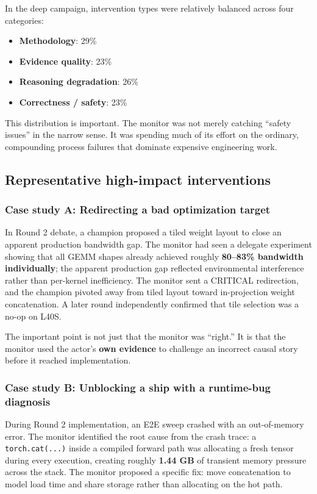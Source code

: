 \documentclass[11pt]{article}
\begin{document}
In the deep campaign, intervention types were relatively balanced across four categories:

\begin{itemize}[leftmargin=*,itemsep=2pt]
  \item \textbf{Methodology}: 29\%
  \item \textbf{Evidence quality}: 23\%
  \item \textbf{Reasoning degradation}: 26\%
  \item \textbf{Correctness / safety}: 23\%
\end{itemize}

This distribution is important. The monitor was not merely catching ``safety issues'' in the narrow sense. It was spending much of its effort on the ordinary, compounding process failures that dominate expensive engineering work.

\subsection{Representative high-impact interventions}

\subsubsection{Case study A: Redirecting a bad optimization target}

In Round 2 debate, a champion proposed a tiled weight layout to close an apparent production bandwidth gap. The monitor had seen a delegate experiment showing that all GEMM shapes already achieved roughly \textbf{80--83\% bandwidth individually}; the apparent production gap reflected environmental interference rather than per-kernel inefficiency. The monitor sent a CRITICAL redirection, and the champion pivoted away from tiled layout toward in-projection weight concatenation. A later round independently confirmed that tile selection was a no-op on L40S.

The important point is not just that the monitor was ``right.'' It is that the monitor used the actor's \textbf{own evidence} to challenge an incorrect causal story before it reached implementation.

\subsubsection{Case study B: Unblocking a ship with a runtime-bug diagnosis}

During Round 2 implementation, an E2E sweep crashed with an out-of-memory error. The monitor identified the root cause from the crash trace: a \texttt{torch.cat(...)} inside a compiled forward path was allocating a fresh tensor during every execution, creating roughly \textbf{1.44 GB} of transient memory pressure across the stack. The monitor proposed a specific fix: move concatenation to model load time and share storage rather than allocating on the hot path.
\end{document}

